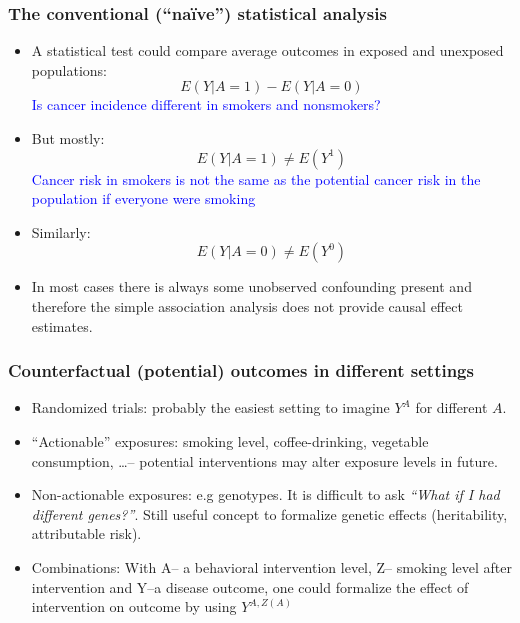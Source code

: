 \documentclass[10pt,dvipsnames,t,handout%
,aspectratio=169%
]{beamer}%
\begin{document}
\begin{frame}
	\frametitle{The conventional (``na\"ive'') statistical analysis}
	{\small  \begin{itemize}
			\item A statistical test could compare average outcomes in exposed and unexposed populations:
			\[E(Y|A=1) - E(Y|A=0)\]
			\textcolor{blue}{Is cancer incidence different in smokers and nonsmokers?}
			\item But mostly:
			\[E(Y|A=1) \ne E(Y^1)\]
			\textcolor{blue}{Cancer risk in smokers is not the same as the potential cancer risk in the population if everyone were smoking}
			\item Similarly:
			\[E(Y|A=0) \ne E(Y^0)\]
			\item In most cases there is always some \alert{unobserved confounding} present and therefore the
			simple association analysis does not provide causal effect estimates.  
	\end{itemize}}
\end{frame}

\begin{frame}
	\frametitle{Counterfactual (potential) outcomes in different settings}
	\begin{itemize}
		\item \alert<1>{Randomized trials}: probably the easiest setting to imagine $Y^A$ for different $A$. \\[0.3cm]
		\item \alert<2>{``Actionable'' exposures}: smoking level, coffee-drinking, vegetable consumption, 
		\ldots -- potential interventions may alter exposure levels in future.\\[0.3cm]
		\item \alert<3>{Non-actionable exposures}: e.g genotypes. It is difficult to ask \emph{``What if I had different genes?''}. Still useful concept to formalize genetic effects (heritability, attributable risk). \\[0.3cm]
		\item \alert<4>{Combinations}: With A-- a behavioral intervention level, Z-- smoking level after intervention and 
		Y--a disease outcome, one could formalize the effect of intervention on outcome by using $Y^{A, Z(A)}$
	\end{itemize}
\end{frame}
\end{document}
